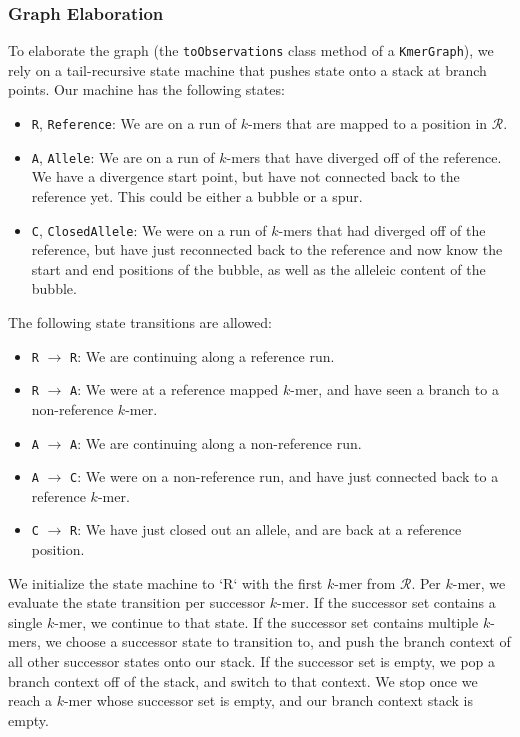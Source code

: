 \documentclass[masters]{ucbthesis}
\begin{document}
\subsubsection{Graph Elaboration}
\label{sec:graph-elaboration}

To elaborate the graph (the \texttt{toObservations} class method of a \texttt{KmerGraph}), we rely on a
tail-recursive state machine that pushes state onto a stack at branch points. Our machine
has the following states:

\begin{itemize}
\item \texttt{R}, \texttt{Reference}: We are on a run of $k$-mers that are mapped to a position in $\mathcal{R}$.
\item \texttt{A}, \texttt{Allele}: We are on a run of $k$-mers that have diverged off of the reference. We have a
divergence start point, but have not connected back to the reference yet. This could be either
a bubble or a spur. 
\item \texttt{C}, \texttt{ClosedAllele}: We were on a run of $k$-mers that had diverged off of the reference, but
have just reconnected back to the reference and now know the start and end positions of the bubble,
as well as the alleleic content of the bubble.
\end{itemize}

The following state transitions are allowed:

\begin{itemize}
\item \texttt{R} $\rightarrow$ \texttt{R}: We are continuing along a reference run.
\item \texttt{R} $\rightarrow$ \texttt{A}: We were at a reference mapped $k$-mer, and have seen a branch to a
non-reference $k$-mer.
\item \texttt{A} $\rightarrow$ \texttt{A}: We are continuing along a non-reference run.
\item \texttt{A} $\rightarrow$ \texttt{C}: We were on a non-reference run, and have just connected back to a
reference $k$-mer.
\item \texttt{C} $\rightarrow$ \texttt{R}: We have just closed out an allele, and are back at a reference position.
\end{itemize}

We initialize the state machine to `R` with the first $k$-mer from $\mathcal{R}$. Per $k$-mer,
we evaluate the state transition per successor $k$-mer. If the successor set contains a single
$k$-mer, we continue to that state. If the successor set contains multiple $k$-mers, we choose
a successor state to transition to, and push the branch context of all other successor states
onto our stack. If the successor set is empty, we pop a branch context off of the stack, and
switch to that context. We stop once we reach a $k$-mer whose successor set is empty, and our
branch context stack is empty.
\end{document}
